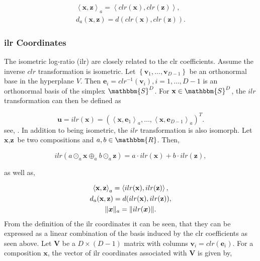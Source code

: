 \begin{gather}
\left\langle  \textbf{x},\textbf{z} \right\rangle_a = \left\langle  clr(\textbf{x}),clr(\textbf{z}) \right\rangle, \\
d_a(\textbf{x},\textbf{z}) = d(clr(\textbf{x}),clr(\textbf{z})).
\label{eq:clr Coefficients isometric}
\end{gather}

\subsubsection{ilr Coordinates}
\label{sec:ilr Coordinates}

The isometric log-ratio (ilr) are closely related to the clr coefficients. Assume the inverse $clr$ transformation is isometric. Let $\left\{\bm{v}_1,\ldots,\bm{v}_{D-1}\right\}$ be an orthonormal base in the hyperplane $V$. Then $\textbf{e}_i = clr^{-1}(\bm{v}_i), i=1,\ldots,D-1$ is an orthonormal basis of the simplex $\mathbbm{S}^D$. For $\textbf{x} \in \mathbbm{S}^D$, the $ilr$ transformation can then be defined as 

\begin{equation}
\textbf{u} = ilr(\textbf{x}) = \left(\left\langle \textbf{x},\textbf{e}_1\right\rangle_a,\ldots,\left\langle \textbf{x},\textbf{e}_{D-1}\right\rangle_a\right)^T.
\label{eq:ilr Coordinates}
\end{equation}
%
see, \textcite{Kynclova:2015}. In addition to being isometric, the $ilr$ transformation is also isomorph. Let $\textbf{x}, \textbf{z}$ be two compositions and $a, b  \in \mathbbm{R}$. Then,

\begin{equation}
ilr(a \odot_a \textbf{x} \oplus_a b \odot_a \textbf{z}) = a \cdot ilr(\textbf{x}) + b \cdot ilr(\textbf{z}),
\label{eq:ilr coordinates isomorph}
\end{equation}

as well as,

\begin{gather}
\left\langle  \textbf{x},\textbf{z} \right\rangle_a = \left\langle  ilr(\textbf{x}), ilr(\textbf{z}) \right\rangle, \\
d_a(\textbf{x},\textbf{z}) = d(ilr(\textbf{x}),ilr(\textbf{z})),\\
\lVert\bm{x}\rVert_a = \lVert ilr(\bm{x})\rVert.
\label{eq:ilr coordinates isometric }
\end{gather}
%
From the definition of the ilr coordinates it can be seen, that they can be expressed as a linear combination of the basis induced by the clr coefficients as seen above. Let $\textbf{V}$ be a $D \times (D-1)$ matrix with columns $\textbf{v}_i = clr(\textbf{e}_i)$. For a composition $\textbf{x}$, the vector of ilr coordinates associated with $\textbf{V}$ is given by,

